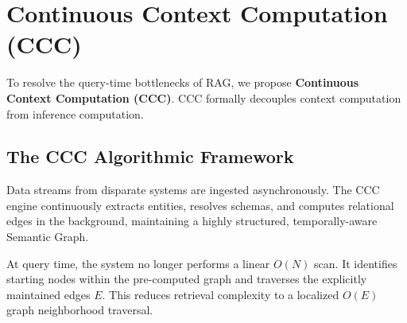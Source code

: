 
\section{Continuous Context Computation (CCC)}
\label{sec:ccc}

To resolve the query-time bottlenecks of RAG, we propose \textbf{Continuous Context Computation (CCC)}. CCC formally decouples context computation from inference computation.

\subsection{The CCC Algorithmic Framework}
Data streams from disparate systems are ingested asynchronously. The CCC engine continuously extracts entities, resolves schemas, and computes relational edges in the background, maintaining a highly structured, temporally-aware Semantic Graph.

At query time, the system no longer performs a linear $O(N)$ scan. It identifies starting nodes within the pre-computed graph and traverses the explicitly maintained edges $E$. This reduces retrieval complexity to a localized $O(E)$ graph neighborhood traversal.

